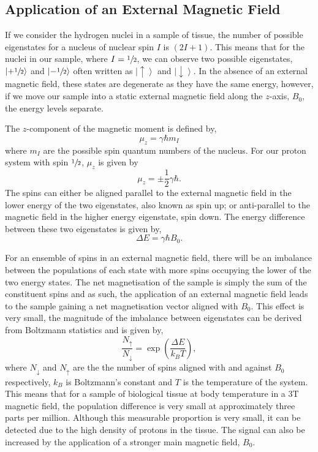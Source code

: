 \subsection{Application of an External Magnetic Field}
If we consider the hydrogen nuclei in a sample of tissue, the number of possible eigenstates for a nucleus of nuclear spin $I$ is $\left(2I + 1\right)$. This means that for the  nuclei in our sample, where $I=\sfrac{1}{2}$, we can observe two possible eigenstates, $\left| + \sfrac{1}{2} \right \rangle$ and $\left| - \sfrac{1}{2} \right \rangle$ often written as $\left|  \uparrow \right \rangle$ and $\left|  \downarrow \right \rangle$. In the absence of an external magnetic field, these states are degenerate as they have the same energy, however, if we move our sample into a static external magnetic field along the $z$-axis, $B_0$, the energy levels separate.

The $z$-component of the magnetic moment is defined by,
\begin{equation}
\mu_z=\gamma \hbar m_I
\label{eq:theory_longitudinal_magnetic_moment}
\end{equation}
where $m_I$ are the possible spin quantum numbers of the nucleus. For our proton system with spin $\sfrac{1}{2}$, $\mu_z$ is given by
\begin{equation}
\mu_z = \pm \frac{1}{2}\gamma\hbar.
\end{equation}
The spins can either be aligned parallel to the external magnetic field in the lower energy of the two eigenstates, also known as spin up; or anti-parallel to the magnetic field in the higher energy eigenstate, spin down. The energy difference between these two eigenstates is given by,
\begin{equation}
\Delta E = \gamma \hbar B_0.
\label{eq:theory_zeeman}
\end{equation}

For an ensemble of spins in an external magnetic field, there will be an imbalance between the populations of each state with more spins occupying the lower of the two energy states. The net magnetisation of the sample is simply the sum of the constituent spins and as such, the application of an external magnetic field leads to the sample gaining a net magnetisation vector aligned with $B_0$. This effect is very small, the magnitude of the imbalance between eigenstates can be derived from Boltzmann statistics and is given by,
\begin{equation}
\frac{N_{\uparrow}}{N_{\downarrow}} = \exp \left(\frac{\Delta E}{k_B T}\right),
\label{eq:theory_boltzman}
\end{equation}
where $N_{\downarrow}$ and $N_{\uparrow}$ are the the number of spins aligned with and against $B_0$ respectively, $k_B$ is Boltzmann's constant and $T$ is the temperature of the system. This means that for a sample of biological tissue at body temperature in a 3T magnetic field, the population difference is very small at approximately three parts per million. Although this measurable proportion is very small, it can be detected due to the high density of protons in the tissue. The signal can also be increased by the application of a stronger main magnetic field, $B_0$.

